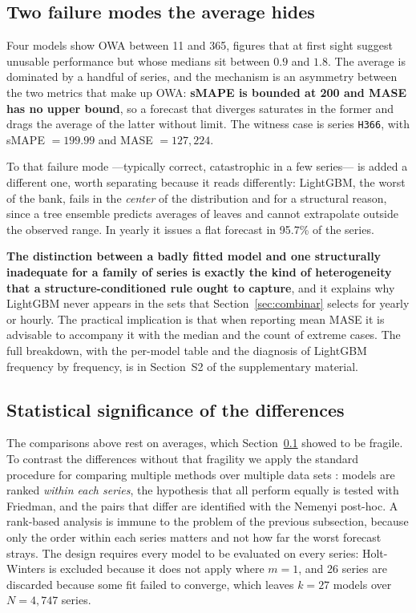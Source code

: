 \subsection{Two failure modes the average hides}\label{sec:extremos}

Four models show OWA between 11 and 365, figures that at first sight suggest unusable
performance but whose medians sit between $0.9$ and $1.8$. The average is dominated by a
handful of series, and the mechanism is an asymmetry between the two metrics that make up
OWA: \textbf{sMAPE is bounded at 200 and MASE has no upper bound}, so a forecast that
diverges saturates in the former and drags the average of the latter without limit. The
witness case is series \texttt{H366}, with sMAPE $=199.99$ and MASE $=127{,}224$.

To that failure mode ---typically correct, catastrophic in a few series--- is added a
different one, worth separating because it reads differently: LightGBM, the worst of the
bank, fails in the \emph{center} of the distribution and for a structural reason, since a
tree ensemble predicts averages of leaves and cannot extrapolate outside the observed
range. In yearly it issues a flat forecast in 95.7\% of the series.

\textbf{The distinction between a badly fitted model and one structurally inadequate for a
family of series is exactly the kind of heterogeneity that a structure-conditioned rule
ought to capture}, and it explains why LightGBM never appears in the sets that
Section~\ref{sec:combinar} selects for yearly or hourly. The practical implication is that
when reporting mean MASE it is advisable to accompany it with the median and the count of
extreme cases. The full breakdown, with the per-model table and the diagnosis of LightGBM
frequency by frequency, is in Section~S2 of the supplementary material.

\subsection{Statistical significance of the differences}\label{sec:friedman}

The comparisons above rest on averages, which Section~\ref{sec:extremos} showed to be
fragile. To contrast the differences without that fragility we apply the standard
procedure for comparing multiple methods over multiple data sets \cite{demsar2006}: models
are ranked \emph{within each series}, the hypothesis that all perform equally is tested
with Friedman, and the pairs that differ are identified with the Nemenyi post-hoc. A
rank-based analysis is immune to the problem of the previous subsection, because only the
order within each series matters and not how far the worst forecast strays. The design
requires every model to be evaluated on every series: Holt-Winters is excluded because it
does not apply where $m=1$, and 26 series are discarded because some fit failed to
converge, which leaves $k=27$ models over $N=4{,}747$ series.

